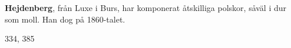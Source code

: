 \textbf{Hejdenberg}, från Luxe i Burs, har komponerat åtskilliga polskor, såväl i dur som moll. Han dog på 1860-talet.

334, 385 
